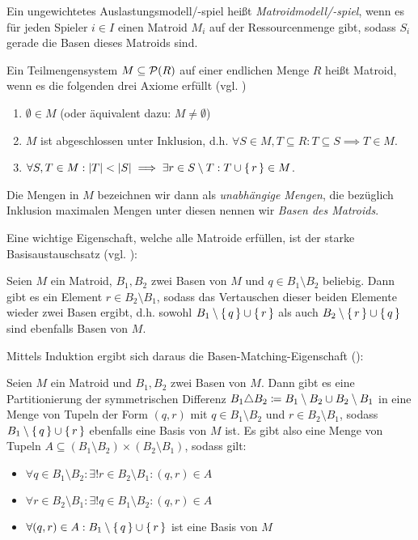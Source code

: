 \begin{defn}
	Ein ungewichtetes Auslastungsmodell/-spiel heißt \emph{Matroidmodell/-spiel}, wenn es für jeden Spieler $i \in I$ einen Matroid $M_i$ auf der Ressourcenmenge gibt, sodass $S_i$ gerade die Basen dieses Matroids sind.
\end{defn}

\begin{defn}
	Ein Teilmengensystem $M \subseteq \mathcal{P}(R)$ auf einer endlichen Menge $R$ heißt Matroid, wenn es die folgenden drei Axiome erfüllt (vgl. \cite[Abschnitt 39.1]{CombOptMatroide})
	\begin{enumerate}
		\item $\emptyset \in M$ (oder äquivalent dazu: $M \neq \emptyset$)
		\item $M$ ist abgeschlossen unter Inklusion, d.h. $\forall S \in M, T \subseteq R: T \subseteq S \implies T \in M$.
		\item $\forall S, T \in M: \left|T\right| < \left|S\right| \implies \exists r \in S \setminus T: T \cup \set{r} \in M$.
	\end{enumerate}
	Die Mengen in $M$ bezeichnen wir dann als \emph{unabhängige Mengen}, die bezüglich Inklusion maximalen Mengen unter diesen nennen wir \emph{Basen des Matroids}.
\end{defn}

Eine wichtige Eigenschaft, welche alle Matroide erfüllen, ist der starke Basisaustauschsatz (vgl. \cite[Theorem 29.12]{CombOptMatroide}):

\begin{satz}
	Seien $M$ ein Matroid, $B_1, B_2$ zwei Basen von $M$ und $q \in B_1 \setminus B_2$ beliebig. Dann gibt es ein Element $r \in B_2 \setminus B_1$, sodass das Vertauschen dieser beiden Elemente wieder zwei Basen ergibt, d.h. sowohl $B_1 \setminus \set{q} \cup \set{r}$ als auch $B_2 \setminus \set{r} \cup \set{q}$ sind ebenfalls Basen von $M$.
\end{satz}

Mittels Induktion ergibt sich daraus die Basen-Matching-Eigenschaft (\cite[Korollar 39.12a]{CombOptMatroide}):

\begin{kor}\label{kor:BasenMatchingEig}
	Seien $M$ ein Matroid und $B_1, B_2$ zwei Basen von $M$. Dann gibt es eine Partitionierung der symmetrischen Differenz $B_1 \triangle B_2 \coloneqq B_1 \setminus B_2 \cup B_2 \setminus B_1$ in eine Menge von Tupeln der Form $(q,r)$ mit $q \in B_1\setminus B_2$ und $r \in B_2 \setminus B_1$, sodass $B_1 \setminus \set{q} \cup \set{r}$ ebenfalls eine Basis von $M$ ist. Es gibt also eine Menge von Tupeln $A \subseteq (B_1 \setminus B_2) \times (B_2 \setminus B_1)$, sodass gilt:
	\begin{itemize}
		\item $\forall q \in B_1 \setminus B_2: \exists! r \in B_2 \setminus B_1: (q,r) \in A$
		\item $\forall r \in B_2 \setminus B_1: \exists! q \in B_1 \setminus B_2: (q,r) \in A$
		\item $\forall (q,r) \in A: B_1 \setminus \set{q} \cup \set{r}$ ist eine Basis von $M$
	\end{itemize}
\end{kor}
